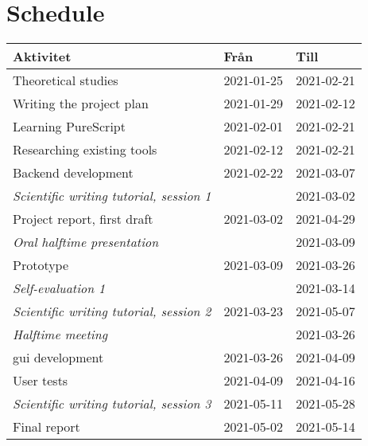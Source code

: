 \section{Schedule}

\begin{center}
    \begin{tabular}{|l|l|l|}
        \hline
        \textbf{Aktivitet}                              & \textbf{Från} & \textbf{Till} \\ \hline
        Theoretical studies                             & 2021-01-25    & 2021-02-21    \\ \hline
        Writing the project plan                        & 2021-01-29    & 2021-02-12    \\ \hline
        Learning PureScript                             & 2021-02-01    & 2021-02-21    \\ \hline
        Researching existing tools                      & 2021-02-12    & 2021-02-21    \\ \hline
        Backend development                             & 2021-02-22    & 2021-03-07    \\ \hline
        \textit{Scientific writing tutorial, session 1} &               & 2021-03-02    \\ \hline
        Project report, first draft                     & 2021-03-02    & 2021-04-29    \\ \hline
        \textit{Oral halftime presentation}             &               & 2021-03-09    \\ \hline
        Prototype                                       & 2021-03-09    & 2021-03-26    \\ \hline
        \textit{Self-evaluation 1}                      &               & 2021-03-14    \\ \hline
        \textit{Scientific writing tutorial, session 2} & 2021-03-23    & 2021-05-07    \\ \hline
        \textit{Halftime meeting}                       &               & 2021-03-26    \\ \hline
        \gls{gui} development                           & 2021-03-26    & 2021-04-09    \\ \hline
        User tests                                      & 2021-04-09    & 2021-04-16    \\ \hline
        \textit{Scientific writing tutorial, session 3} & 2021-05-11    & 2021-05-28    \\ \hline
        {Final report}                                  & 2021-05-02    & 2021-05-14    \\ \hline

\end{tabular}
\end{center}
